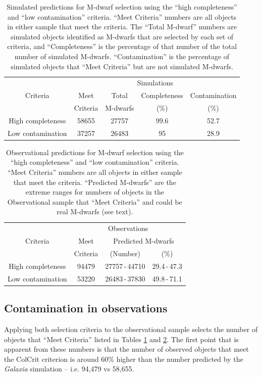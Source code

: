 \begin{table}
	\begin{tabular}{ | c | c c c c | } 
		\hline
		& \multicolumn{4}{c|}{Simulations}\\
		\cline{2-5}
		Criteria & Meet & Total & Completeness & Contamination\\
		         & Criteria & M-dwarfs & (\%) & (\%)\\
		\hline
		High completeness & 58655 & 27757 & 99.6 & 52.7\\
		Low contamination & 37257 & 26483 & 95 & 28.9\\
		\hline
	\end{tabular}
    \caption{Simulated predictions for M-dwarf selection using the ``high completeness'' and ``low contamination'' criteria. ``Meet Criteria'' numbers are all objects in either sample that meet the criteria. The ``Total M-dwarf'' numbers are simulated objects identified as M-dwarfs that are selected by each set of criteria, and ``Completeness'' is the percentage of that number of the total number of simulated M-dwarfs. ``Contamination'' is the percentage of simulated objects that ``Meet Criteria'' but are not simulated M-dwarfs.}
    \label{tabCritA}
\end{table}
\begin{table}
    \centering
	\begin{tabular}{ | c | c c c | } 
		\hline
		& \multicolumn{3}{c|}{Observations}\\
		\cline{2-4}
		Criteria & Meet     & \multicolumn{2}{c|}{Predicted M-dwarfs}\\
		         & Criteria & (Number)  & (\%)\\
		\hline
		High completeness & 94479 & 27757\,-\,44710 & 29.4\,-\,47.3\\
		Low contamination & 53220 & 26483\,-\,37830 & 49.8\,-\,71.1\\
		\hline
	\end{tabular}
    \caption{Observational predictions for M-dwarf selection using the ``high completeness'' and ``low contamination'' criteria. ``Meet Criteria'' numbers are all objects in either sample that meet the criteria. ``Predicted M-dwarfs'' are the extreme ranges for numbers of objects in the Observational sample that ``Meet Criteria'' and could be real M-dwarfs (see text).}
    \label{tabCritB}
\end{table}
\subsection{Contamination in observations}
Applying both selection criteria to the observational sample selects the number of objects that ``Meet Criteria'' listed in Tables \ref{tabCritA} and \ref{tabCritB}. The first point that is apparent from these numbers is that the number of observed objects that meet the ColCrit criterion is around 60\% higher than the number predicted by the {\em Galaxia} simulation -- i.e. 94,479 vs 58,655.\\

